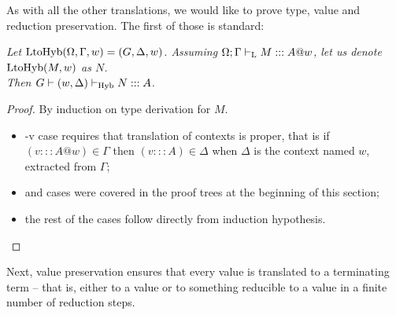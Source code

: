 As with all the other translations, we would like to prove type, value and reduction preservation. The first of those is standard:

\begin{theorem}\em
Let $\mbox{$\operatorname{LtoHyb}({\Omega}, {\Gamma, w})$} = (G, \Delta, w)$. Assuming $\Omega; \Gamma |-_{\text{L}} M ::: A @ w$, let us denote $\mbox{$\operatorname{LtoHyb}({M}, {w})$}$ as $N$.\\
Then ${G |- (w, \Delta) |-_{\text{Hyb}} N ::: A}$.
\begin{proof}
By induction on type derivation for $M$.
\begin{itemize}
\item \hyp{v} case requires that translation of contexts is proper, that is if ${(v ::: A @ w) \in \Gamma}$ then ${(v:::A) \in \Delta}$ when $\Delta$ is the context named $w$, extracted from $\Gamma$;
\item {} and  cases were covered in the proof trees at the beginning of this section;
\item the rest of the cases follow directly from induction hypothesis.
\end{itemize}
\end{proof}
\end{theorem}

Next, value preservation ensures that every value is translated to a terminating term -- that is, either to a value or to something reducible to a value in a finite number of reduction steps.

